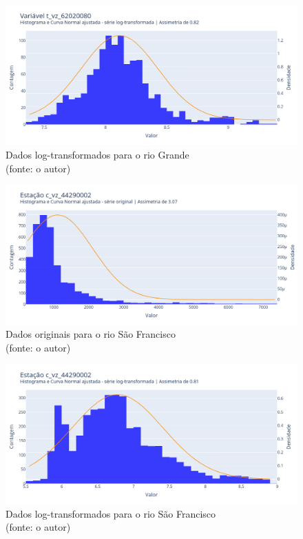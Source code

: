 \begin{figure}[!h]
	\centering
	\includegraphics[scale=0.33]{Figuras/rio_grande/grande_estacao_t_vz_62020080_log.png}
	\caption{Dados log-transformados para o rio Grande\\(fonte: o autor)}
	\label{fig:rio_grande_depois_log}
\end{figure}

\begin{figure}[!h]
	\centering
	\includegraphics[scale=0.33]{Figuras/rio_sao_francisco/sao_francisco_estacao_c_vz_44290002_original.png}
	\caption{Dados originais para o rio São Francisco\\(fonte: o autor)}
	\label{fig:rio_sao_francisco_antes_log}
\end{figure}

\begin{figure}[!h]
	\centering
	\includegraphics[scale=0.33]{Figuras/rio_sao_francisco/sao_francisco_estacao_c_vz_44290002_log.png}
	\caption{Dados log-transformados para o rio São Francisco\\(fonte: o autor)}
	\label{fig:rio_sao_francisco_depois_log}
\end{figure}
\clearpage

